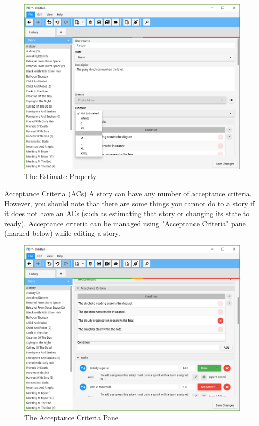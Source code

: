 \begin{figure}[H]
\centering
\includegraphics[width=\textwidth]{images/screenshots/Estimate1.PNG}
\caption{The Estimate Property}
\label{fig:new_project}
\end{figure}

Acceptance Criteria (ACs)\newline
A story can have any number of acceptance criteria. However, you should note that there are some things you cannot do to a story if it does not have an ACs (such as estimating that story or changing its state to ready). Acceptance criteria can be managed using "Acceptance Criteria" pane (marked below) while editing a story.

\begin{figure}[H]
\centering
\includegraphics[width=\textwidth]{images/screenshots/AcceptanceCriteria1.PNG}
\caption{The Acceptance Criteria Pane}
\label{fig:new_project}
\end{figure}

